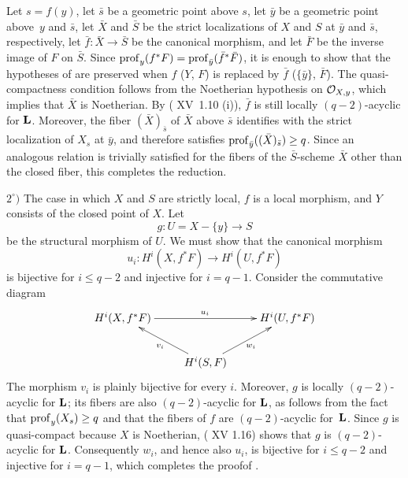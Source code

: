 Let $s=f(y)$, let $\bar s$ be a geometric point above $s$, let $\bar y$ be a geometric point above~$y$ and $\bar s$, let $\bar X$ and $\bar S$ be the strict localizations of $X$ and $S$ at $\bar y$ and $\bar s$, respectively, let $\bar f:\bar X\to\bar S$ be the canonical morphism, and let $\bar F$ be the inverse image of $F$ on $\bar S$. Since $\operatorname{prof}_y(f^*F)=\operatorname{prof}_{\bar y}(\bar f^*\bar F)$, it is enough to show that the hypotheses of  are preserved when $f$ (\resp $Y$, \resp $F$) is replaced by $\bar f$ (\resp $\{\bar y\}$, \resp $\bar F$). The quasi-compactness condition follows from the Noetherian hypothesis on $\mathcal O_{X,y}$, which implies that $\bar X$ is Noetherian\pageoriginale. By ( XV~1.10 \textup{(i)}), $\bar f$ is still locally $(q-2)$-acyclic for $\mathbf L$. Moreover, the fiber $(\bar X)_{\bar s}$ of $\bar X$ above $\bar s$ identifies with the strict localization of $X_s$ at $\bar y$, and therefore satisfies $\operatorname{prof}_{\bar y}((\bar X)_{\bar s})\geq q$. Since an analogous relation is trivially satisfied for the fibers of the $\bar S$-scheme $\bar X$ other than the closed fiber, this completes the reduction.

$2^\circ)$ The case in which $X$ and $S$ are strictly local, $f$ is a local morphism, and $Y$ consists of the closed point of $X$. Let
$$g:U=X-\{y\}\to S$$
be the structural morphism of $U$. We must show that the canonical morphism
$$u_i:H^i(X, f^*F)\to H^i(U, f^*F)$$
is bijective for $i\leq q-2$ and injective for $i=q-1$. Consider the commutative diagram
$$
\xymatrix{H^i(X, f^*F)\ar[rr]^{u_i}&& H^i(U, f^*F)\\&H^i(S, F)\ar[lu]^{v_i}\ar[ru]_{w_i}}$$
The morphism $v_i$ is plainly bijective for every $i$. Moreover, $g$ is locally $(q-2)$-acyclic for $\mathbf L$; its fibers are also $(q-2)$-acyclic for $\mathbf L$, as follows from the fact that $\operatorname{prof}_y(X_s)\geq q$ and that the fibers of $f$ are $(q-2)$-acyclic for~$\mathbf L$. Since $g$ is quasi-compact because $X$ is Noetherian, ( XV 1.16) shows that $g$ is $(q-2)$-acyclic for $\mathbf L$. Consequently $w_i$, and hence also $u_i$, is bijective for $i\leq q-2$ and injective for $i=q-1$, which completes the proof\pageoriginale of .

